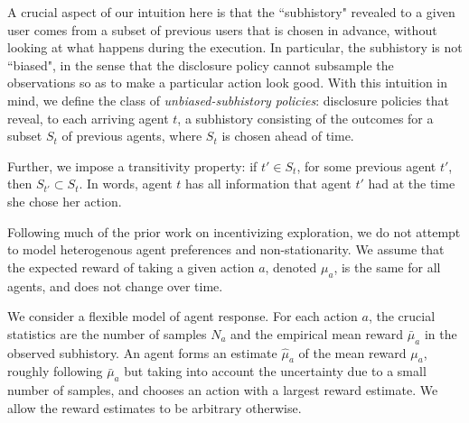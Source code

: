 A crucial aspect of our intuition here is that the ``subhistory" revealed to a given user comes from a subset of previous users that is chosen in advance, without looking at what happens during the execution. In particular, the subhistory is not ``biased", in the sense that the disclosure policy cannot subsample the observations so as to make a particular action look good. 
With this intuition in mind, we define the class of \emph{unbiased-subhistory policies}: disclosure policies that reveal, to each arriving agent $t$, a subhistory  consisting of the outcomes for a subset $S_t$ of previous agents, where $S_t$ is chosen ahead of time. 

Further, we impose a transitivity property: if $t' \in S_t$, for some previous agent $t'$, then $S_{t'}\subset S_t$. In words, agent $t$ has all information that agent $t'$ had at the time she chose her action. 

Following much of the prior work on incentivizing exploration, we do not attempt to model heterogenous agent preferences and non-stationarity. We assume that the expected reward of taking a given action $a$, denoted $\mu_a$, is the same for all agents, and does not change over time. 

We consider a flexible model of agent response. For each action $a$, the crucial statistics are the number of samples $N_a$ and the empirical mean reward $\bar{\mu}_a$ in the observed subhistory. An agent forms an estimate $\hat{\mu}_a$ of the mean reward $\mu_a$, roughly following $\bar{\mu}_a$ but taking into account the uncertainty due to a small number of samples, and chooses an action with a largest reward estimate. We allow the reward estimates to be arbitrary otherwise. 

